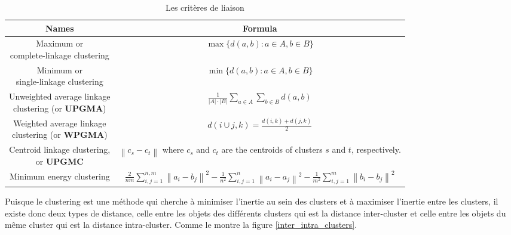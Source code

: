 \begin{table}[!htbp]
    \centering
	\begin{tabular}{|c| c|}
	\hline
	\rowcolor{blueforest}
	\color{white} \textbf{Names} & \color{white} \textbf{Formula}  \\ \hline
	\makecell{Maximum or \\ complete-linkage clustering}   & \(\displaystyle \max \{d(a,b): a \in A,b \in B \} \)   \\  \hline
	\makecell{Minimum or \\ single-linkage clustering}   & \(\displaystyle \min \{d(a,b): a \in A,b \in B \} \)   \\  \hline
	\makecell{ Unweighted average linkage \\ clustering (or \textbf{UPGMA})} & \(\displaystyle \frac{1}{ \left\lvert A\right\rvert  \cdot \left\lvert B\right\rvert } \sum_{a \in A} \sum_{b \in B} d(a,b)  \)   \\  \hline
	\makecell{Weighted average linkage \\ clustering (or \textbf{WPGMA})}  & \(\displaystyle d(i \cup j,k) = \frac{d(i,k)+d(j,k)}{2} \)   \\  \hline
	\makecell{Centroid linkage clustering,\\ or \textbf{UPGMC}}   & \makecell{\(\displaystyle \left\lVert c_{s} - c_{t} \right\rVert \) where \(\displaystyle c_{s} \) and \(\displaystyle c_{t} \)  are the \\ centroids of clusters  \(\displaystyle s \) and \(\displaystyle t \), respectively.}   \\  \hline
	Minimum energy clustering  & \(\displaystyle \frac{2}{nm}\sum_{i,j=1}^{n,m} \left\lVert
	a_{i} - b_{j}\right\rVert^{2} - \frac{1}{n^{2}} \sum_{i,j=1}^{n} \left\lVert
	a_{i} - a_{j}\right\rVert^{2}  - \frac{1}{m^{2}} \sum_{i,j=1}^{m} \left\lVert
	b_{i} - b_{j}\right\rVert^{2}   \)   \\  \hline
	\end{tabular}
	\caption{Les critères de liaison }
	\label{linkage_criteria}
\end{table}

Puisque le clustering est une méthode qui cherche à minimiser l'inertie au sein des clusters et à maximiser l'inertie entre les clusters, il existe donc deux types de distance, celle entre les objets des différents clusters qui est la distance inter-cluster et celle entre les objets du même cluster qui est la distance intra-cluster. Comme le montre la figure \ref{inter_intra_clusters}.

